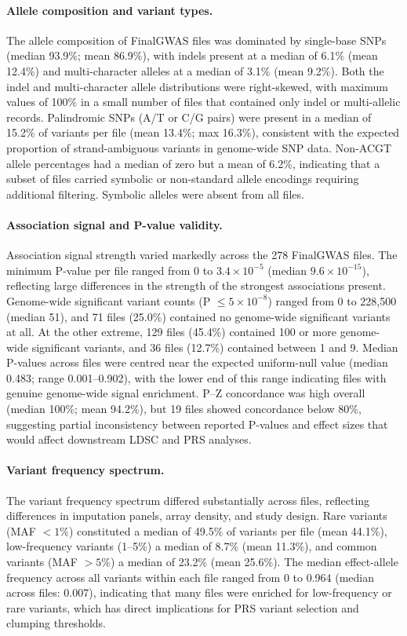 \documentclass[11pt,a4paper]{article}
\begin{document}
\paragraph{Allele composition and variant types.}The allele composition of FinalGWAS files was dominated by single-base SNPs (median 93.9\%; mean 86.9\%), with indels present at a median of 6.1\% (mean 12.4\%) and multi-character alleles at a median of 3.1\% (mean 9.2\%). Both the indel and multi-character allele distributions were right-skewed, with maximum values of 100\% in a small number of files that contained only indel or multi-allelic records. Palindromic SNPs (A/T or C/G pairs) were present in a median of 15.2\% of variants per file (mean 13.4\%; max 16.3\%), consistent with the expected proportion of strand-ambiguous variants in genome-wide SNP data. Non-ACGT allele percentages had a median of zero but a mean of 6.2\%, indicating that a subset of files carried symbolic or non-standard allele encodings requiring additional filtering. Symbolic alleles were absent from all files.

\paragraph{Association signal and P-value validity.}Association signal strength varied markedly across the 278 FinalGWAS files. The minimum P-value per file ranged from 0 to $3.4 \times 10^{-5}$ (median $9.6 \times 10^{-15}$), reflecting large differences in the strength of the strongest associations present. Genome-wide significant variant counts (P $\leq 5 \times 10^{-8}$) ranged from 0 to 228,500 (median 51), and 71 files (25.0\%) contained no genome-wide significant variants at all. At the other extreme, 129 files (45.4\%) contained 100 or more genome-wide significant variants, and 36 files (12.7\%) contained between 1 and 9. Median P-values across files were centred near the expected uniform-null value (median 0.483; range 0.001--0.902), with the lower end of this range indicating files with genuine genome-wide signal enrichment. P--Z concordance was high overall (median 100\%; mean 94.2\%), but 19 files showed concordance below 80\%, suggesting partial inconsistency between reported P-values and effect sizes that would affect downstream LDSC and PRS analyses.

\paragraph{Variant frequency spectrum.}The variant frequency spectrum differed substantially across files, reflecting differences in imputation panels, array density, and study design. Rare variants (MAF $< 1\%$) constituted a median of 49.5\% of variants per file (mean 44.1\%), low-frequency variants (1--5\%) a median of 8.7\% (mean 11.3\%), and common variants (MAF $> 5\%$) a median of 23.2\% (mean 25.6\%). The median effect-allele frequency across all variants within each file ranged from 0 to 0.964 (median across files: 0.007), indicating that many files were enriched for low-frequency or rare variants, which has direct implications for PRS variant selection and clumping thresholds.
\end{document}
